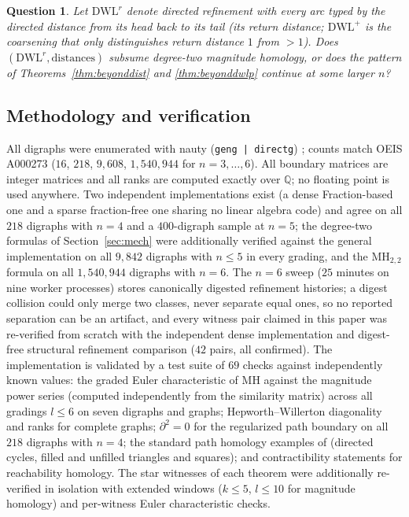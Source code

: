 \documentclass[pdflatex,sn-mathphys,Numbered]{sn-jnl}
\theoremstyle{thmstyleone}
\newtheorem{question}[theorem]{Question}
\theoremstyle{thmstyletwo}
\newcommand{\MH}{\mathrm{MH}}
\newcommand{\QQ}{\mathbb{Q}}
\newcommand{\dwl}{\mathrm{DWL}}
\newcommand{\dwlp}{\mathrm{DWL}^{+}}
\begin{document}
\begin{question}\label{q:returntyped}
Let $\dwl^{r}$ denote directed refinement with every arc typed by the
directed distance from its head back to its tail (its return distance;
$\dwlp$ is the coarsening that only distinguishes return distance $1$
from $> 1$). Does $(\dwl^{r}, \text{distances})$ subsume degree-two
magnitude homology, or does the pattern of
Theorems~\ref{thm:beyonddist} and \ref{thm:beyonddwlp} continue at some
larger $n$?
\end{question}

\subsection*{Methodology and verification}

All digraphs were enumerated with nauty (\texttt{geng | directg})
\cite{nauty}; counts match OEIS A000273 ($16$, $218$, $9{,}608$,
$1{,}540{,}944$ for $n = 3, \dots, 6$). All boundary matrices are
integer matrices and all ranks are computed exactly over $\QQ$; no
floating point is used anywhere. Two independent implementations exist
(a dense Fraction-based one and a sparse fraction-free one sharing no
linear algebra code) and agree on all $218$ digraphs with $n = 4$ and a
$400$-digraph sample at $n = 5$; the degree-two formulas of
Section~\ref{sec:mech} were additionally verified against the general
implementation on all $9{,}842$ digraphs with $n \le 5$ in every
grading, and the $\MH_{2,2}$ formula on all $1{,}540{,}944$ digraphs
with $n = 6$. The $n = 6$ sweep ($25$ minutes on nine worker processes)
stores canonically digested refinement histories; a digest collision
could only merge two classes, never separate equal ones, so no reported
separation can be an artifact, and every witness pair claimed in this
paper was re-verified from scratch with the independent dense
implementation and digest-free structural refinement comparison ($42$
pairs, all confirmed). The
implementation is validated by a test suite of $69$ checks against
independently known values: the graded Euler characteristic of $\MH$
against the magnitude power series (computed independently from the
similarity matrix) across all gradings $l \le 6$ on seven digraphs and
graphs; Hepworth--Willerton diagonality and ranks for complete graphs;
$\partial^2 = 0$ for the regularized path boundary on all $218$
digraphs with $n = 4$; the standard path homology examples of
\cite{GLMY12} (directed cycles, filled and unfilled triangles and
squares); and contractibility statements for reachability homology. The
star witnesses of each theorem were additionally re-verified in isolation
with extended windows ($k \le 5$, $l \le 10$ for magnitude homology) and
per-witness Euler characteristic checks.
\end{document}
